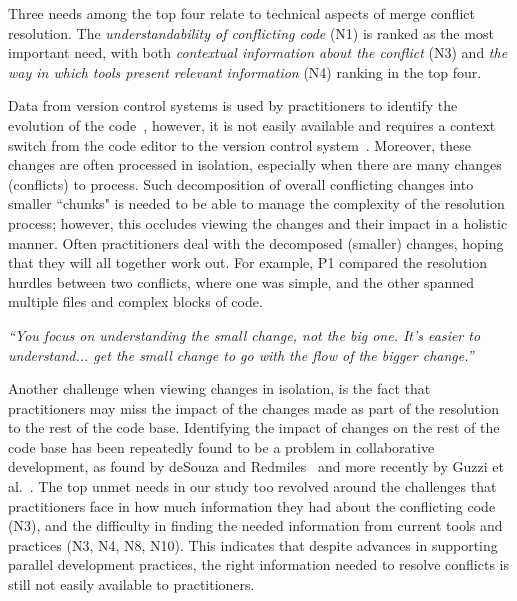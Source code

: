 Three needs among the top four relate to technical aspects of merge conflict resolution.
The \textit{understandability of conflicting code} (N1) is ranked as the most important need, with both \textit{contextual information about the conflict} (N3) and \textit{the way in which tools present relevant information} (N4) ranking in the top four.

Data from version control systems is used by practitioners to identify the evolution of the code~\cite{Mihai_lenses}, however, it is not easily available and requires a context switch from the code editor to the version control system~\cite{Guzzi2015}. 
Moreover, these changes are often processed in isolation, especially when there are many changes (conflicts) to process. 
Such decomposition of overall conflicting changes into smaller ``chunks" is needed to be able to manage the complexity of the resolution process; however, this occludes viewing the changes and their impact in a holistic manner. 
Often practitioners deal with the decomposed (smaller) changes, hoping that they will all together work out. 
For example, P1 compared the resolution hurdles between two conflicts, where one was simple, and the other spanned multiple files and complex blocks of code.
\begin{quoting}
\textit{``You focus on understanding the small change, not the big one. It's easier to understand... get the small change to go with the flow of the bigger change.''}
\end{quoting}

Another challenge when viewing changes in isolation, is the fact that practitioners may miss the impact of the changes made as part of the resolution to the rest of the code base. 
Identifying the impact of changes on the rest of the code base has been repeatedly found to be a problem in collaborative development, as found by deSouza and Redmiles~\cite{deSouza2008} and more recently by Guzzi et al.~\cite{Guzzi2015}. 
The top unmet needs in our study too revolved around the challenges that practitioners face in how much information they had about the conflicting code (N3), and the difficulty in finding the needed information from current tools and practices (N3, N4, N8, N10). 
This indicates that despite advances in supporting parallel development practices, the right information needed to resolve conflicts is still not easily available to practitioners. 

